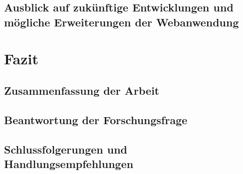 \documentclass[fontsize=12pt,openright,oneside,paper=a4,BCOR=1cm]{scrbook}
\begin{document}
\section{Ausblick auf zukünftige Entwicklungen und mögliche Erweiterungen der Webanwendung}

%
%

\renewcommand{\cleardoublepage}{}
\chapter{Fazit}

\section{Zusammenfassung der Arbeit}

\section{Beantwortung der Forschungsfrage}

\section{Schlussfolgerungen und Handlungsempfehlungen}






\end{document}
